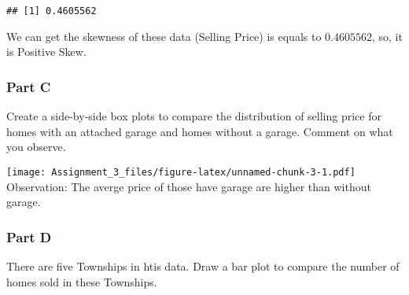 \documentclass[]{article}
\newenvironment{Shaded}{\begin{snugshade}}{\end{snugshade}}
\newcommand{\KeywordTok}[1]{\textcolor[rgb]{0.13,0.29,0.53}{\textbf{#1}}}
\newcommand{\DataTypeTok}[1]{\textcolor[rgb]{0.13,0.29,0.53}{#1}}
\newcommand{\DecValTok}[1]{\textcolor[rgb]{0.00,0.00,0.81}{#1}}
\newcommand{\StringTok}[1]{\textcolor[rgb]{0.31,0.60,0.02}{#1}}
\newcommand{\OtherTok}[1]{\textcolor[rgb]{0.56,0.35,0.01}{#1}}
\newcommand{\OperatorTok}[1]{\textcolor[rgb]{0.81,0.36,0.00}{\textbf{#1}}}
\newcommand{\NormalTok}[1]{#1}
\begin{document}
\begin{verbatim}
## [1] 0.4605562
\end{verbatim}

We can get the skewness of these data (Selling Price) is equals to
\(0.4605562\), so, it is Positive Skew.

\subsubsection{Part C}\label{part-c}

Create a side-by-side box plots to compare the distribution of selling
price for homes with an attached garage and homes without a garage.
Comment on what you observe.

\begin{Shaded}
\end{Shaded}

\texttt{[image: Assignment\_3\_files/figure-latex/unnamed-chunk-3-1.pdf]}
Observation: The averge price of those have garage are higher than
without garage.

\subsubsection{Part D}\label{part-d}

There are five Townships in htis data. Draw a bar plot to compare the
number of homes sold in these Townships.
\end{document}
